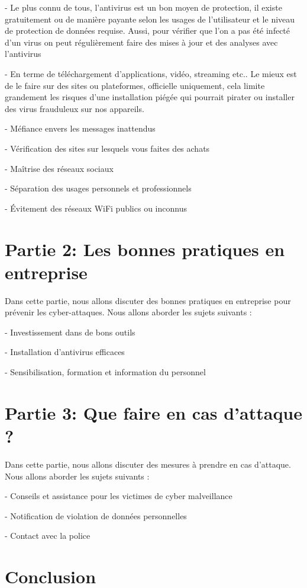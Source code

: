 \documentclass[a4paper,11pt]{article}
\begin{document}
  - Le plus connu de tous, l’antivirus est un bon moyen de protection, il existe gratuitement ou de manière payante selon les usages de l’utilisateur et le niveau de protection de données requise. Aussi, pour vérifier que l’on a pas été infecté d’un virus on peut régulièrement faire des mises à jour et des analyses avec l’antivirus


  - En terme de téléchargement d’applications, vidéo, streaming etc.. Le mieux est de le faire sur des sites ou plateformes, officielle uniquement, cela limite grandement les risques d’une installation piégée qui pourrait pirater ou installer des virus frauduleux sur nos appareils.

  - Méfiance envers les messages inattendus

  - Vérification des sites sur lesquels vous faites des achats

  - Maîtrise des réseaux sociaux

  - Séparation des usages personnels et professionnels

  - Évitement des réseaux WiFi publics ou inconnus


\section{Partie 2: Les bonnes pratiques en entreprise}

Dans cette partie, nous allons discuter des bonnes pratiques en entreprise pour prévenir les cyber-attaques. Nous allons aborder les sujets suivants :

  - Investissement dans de bons outils

  - Installation d’antivirus efficaces

  - Sensibilisation, formation et information du personnel


\section{Partie 3: Que faire en cas d’attaque ?}

Dans cette partie, nous allons discuter des mesures à prendre en cas d’attaque. Nous allons aborder les sujets suivants :

  - Conseils et assistance pour les victimes de cyber malveillance

  - Notification de violation de données personnelles

  - Contact avec la police


\section{Conclusion}




\end{document}
